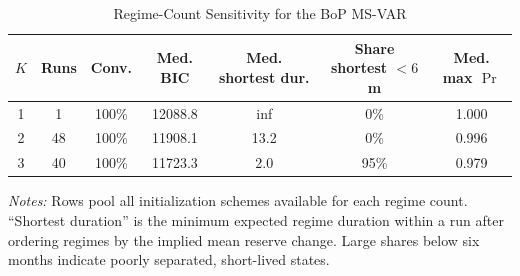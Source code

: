 \begin{table}[htbp]
\centering
\scriptsize
\caption{Regime-Count Sensitivity for the BoP MS-VAR}
\label{tab:regime_count_sensitivity}
\begin{tabular}{ccccccc}
\toprule
$K$ & Runs & Conv. & Med. BIC & Med. shortest dur. & Share shortest $<6$m & Med. max $\Pr$ \\
\midrule
1 & 1 & 100\% & 12088.8 & inf & 0\% & 1.000 \\
2 & 48 & 100\% & 11908.1 & 13.2 & 0\% & 0.996 \\
3 & 40 & 100\% & 11723.3 & 2.0 & 95\% & 0.979 \\
\bottomrule
\end{tabular}
\begin{tablenotes}
\footnotesize
\item \textit{Notes:} Rows pool all initialization schemes available for each regime count. ``Shortest duration'' is the minimum expected regime duration within a run after ordering regimes by the implied mean reserve change. Large shares below six months indicate poorly separated, short-lived states.
\end{tablenotes}
\end{table}